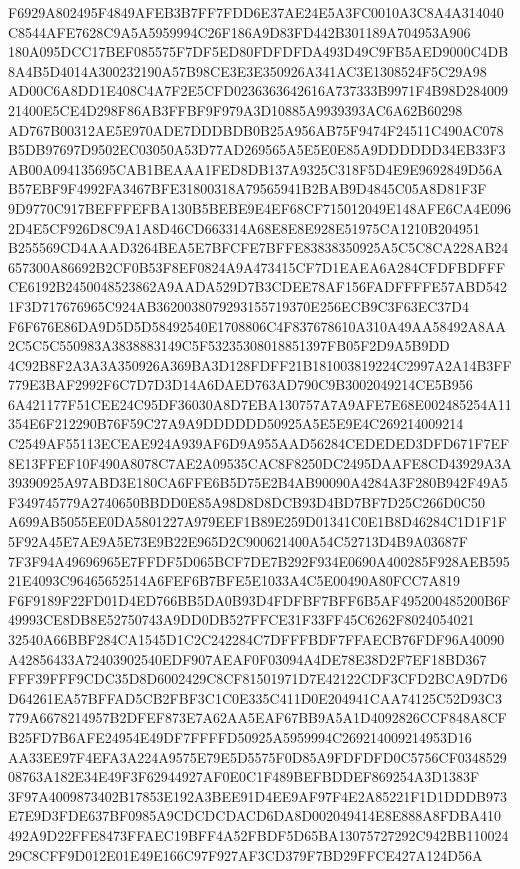 \documentclass[UTF8,fontset=fandol,zihao=-4,a4paper]{ctexart}
\begin{document}
{{F6929A802495F4849AFEB3B7FF7FDD6E37AE24E5A3FC0010A3C8A4A314040C8544AFE7628C9A5A5959994C26F186A9D83FD442B301189A704953A906
180A095DCC17BEF085575F7DF5ED80FDFDFDA493D49C9FB5AED9000C4DB8A4B5D4014A300232190A57B98CE3E3E350926A341AC3E1308524F5C29A98
AD00C6A8DD1E408C4A7F2E5CFD0236363642616A737333B9971F4B98D28400921400E5CE4D298F86AB3FFBF9F979A3D10885A9939393AC6A62B60298
AD767B00312AE5E970ADE7DDDBDB0B25A956AB75F9474F24511C490AC078B5DB97697D9502EC03050A53D77AD269565A5E5E0E85A9DDDDDD34EB33F3
AB00A094135695CAB1BEAAA1FED8DB137A9325C318F5D4E9E9692849D56AB57EBF9F4992FA3467BFE31800318A79565941B2BAB9D4845C05A8D81F3F
9D9770C917BEFFFEFBA130B5BEBE9E4EF68CF715012049E148AFE6CA4E0962D4E5CF926D8C9A1A8D46CD663314A68E8E8E928E51975CA1210B204951
B255569CD4AAAD3264BEA5E7BFCFE7BFFE83838350925A5C5C8CA228AB24657300A86692B2CF0B53F8EF0824A9A473415CF7D1EAEA6A284CFDFBDFFF
CE6192B2450048523862A9AADA529D7B3CDEE78AF156FADFFFFE57ABD5421F3D717676965C924AB3620038079293155719370E256ECB9C3F63EC37D4
F6F676E86DA9D5D5D58492540E1708806C4F837678610A310A49AA58492A8AA2C5C5C550983A3838883149C5F53235308018851397FB05F2D9A5B9DD
4C92B8F2A3A3A350926A369BA3D128FDFF21B181003819224C2997A2A14B3FF779E3BAF2992F6C7D7D3D14A6DAED763AD790C9B3002049214CE5B956
6A421177F51CEE24C95DF36030A8D7EBA130757A7A9AFE7E68E002485254A11354E6F212290B76F59C27A9A9DDDDDD50925A5E5E9E4C269214009214
C2549AF55113ECEAE924A939AF6D9A955AAD56284CEDEDED3DFD671F7EF8E13FFEF10F490A8078C7AE2A09535CAC8F8250DC2495DAAFE8CD43929A3A
39390925A97ABD3E180CA6FFE6B5D75E2B4AB90090A4284A3F280B942F49A5F349745779A2740650BBDD0E85A98D8D8DCB93D4BD7BF7D25C266D0C50
A699AB5055EE0DA5801227A979EEF1B89E259D01341C0E1B8D46284C1D1F1F5F92A45E7AE9A5E73E9B22E965D2C900621400A54C52713D4B9A03687F
7F3F94A49696965E7FFDF5D065BCF7DE7B292F934E0690A400285F928AEB59521E4093C96465652514A6FEF6B7BFE5E1033A4C5E00490A80FCC7A819
F6F9189F22FD01D4ED766BB5DA0B93D4FDFBF7BFF6B5AF495200485200B6F49993CE8DB8E52750743A9DD0DB527FFCE31F33FF45C6262F8024054021
32540A66BBF284CA1545D1C2C242284C7DFFFBDF7FFAECB76FDF96A40090A42856433A72403902540EDF907AEAF0F03094A4DE78E38D2F7EF18BD367
FFF39FFF9CDC35D8D6002429C8CF81501971D7E42122CDF3CFD2BCA9D7D6D64261EA57BFFAD5CB2FBF3C1C0E335C411D0E204941CAA74125C52D93C3
779A6678214957B2DFEF873E7A62AA5EAF67BB9A5A1D4092826CCF848A8CFB25FD7B6AFE24954E49DF7FFFFD50925A5959994C269214009214953D16
AA33EE97F4EFA3A224A9575E79E5D5575F0D85A9FDFDFD0C5756CF034852908763A182E34E49F3F62944927AF0E0C1F489BEFBDDEF869254A3D1383F
3F97A4009873402B17853E192A3BEE91D4EE9AF97F4E2A85221F1D1DDDB973E7E9D3FDE637BF0985A9CDCDCDACD6DA8D002049414E8E888A8FDBA410
492A9D22FFE8473FFAEC19BFF4A52FBDF5D65BA13075727292C942BB11002429C8CFF9D012E01E49E166C97F927AF3CD379F7BD29FFCE427A124D56A
}}
\end{document}
